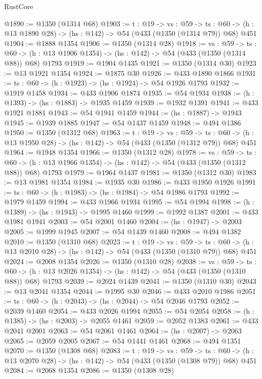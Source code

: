 \begin{lexlean}{RustCore}
\begin{coremodule}
@1890 := @1350 (@1314 @68)
@1903 := {t : @19} ->
  {vs : @59} ->
  {ts : @60} -> (h : @13 @1890 @28) -> (hs : @142) -> @54 (@433 (@1350 (@1314 @79)) @68) @451
@1904 := @1888 @1354
@1906 := @1350 (@1314 @28)
@1918 := {vs : @59} ->
  {ts : @60} -> (h : @13 @1906 @1354) -> (hs : @142) -> @54 (@433 (@1350 (@1314 @88)) @68) @1793
@1919 := @1904 @1435
@1921 := @1350 (@1314 @30)
@1923 := @13 @1921 @1354
@1924 := @1875 @30
@1926 := @433 @1890 @1866
@1931 := {ts : @60} -> (h : @1923) -> (hs : @1924) -> @54 @1926 @1793
@1932 := @1919 @1458
@1934 := @433 @1906 @1874
@1935 := @54 @1934
@1938 := (h : @1393) -> (hs : @1883) -> @1935 @1459
@1939 := @1932 @1391
@1941 := @433 @1921 @1881
@1943 := @54 @1941 @1459
@1944 := (hs : @1887) -> @1943
@1945 := @1939 @1885
@1947 := @54 @1437 @1459
@1948 := @494 @1386
@1950 := @1350 (@1312 @68)
@1963 := {t : @19} ->
  {vs : @59} ->
  {ts : @60} -> (h : @13 @1950 @28) -> (hs : @142) -> @54 (@433 (@1350 (@1312 @79)) @68) @451
@1964 := @1948 @1354
@1966 := @1350 (@1312 @28)
@1978 := {vs : @59} ->
  {ts : @60} -> (h : @13 @1966 @1354) -> (hs : @142) -> @54 (@433 (@1350 (@1312 @88)) @68) @1793
@1979 := @1964 @1437
@1981 := @1350 (@1312 @30)
@1983 := @13 @1981 @1354
@1984 := @1935 @30
@1986 := @433 @1950 @1926
@1991 := {ts : @60} -> (h : @1983) -> (hs : @1984) -> @54 @1986 @1793
@1992 := @1979 @1459
@1994 := @433 @1966 @1934
@1995 := @54 @1994
@1998 := (h : @1389) -> (hs : @1943) -> @1995 @1460
@1999 := @1992 @1387
@2001 := @433 @1981 @1941
@2003 := @54 @2001 @1460
@2004 := (hs : @1947) -> @2003
@2005 := @1999 @1945
@2007 := @54 @1439 @1460
@2008 := @494 @1382
@2010 := @1350 (@1310 @68)
@2023 := {t : @19} ->
  {vs : @59} ->
  {ts : @60} -> (h : @13 @2010 @28) -> (hs : @142) -> @54 (@433 (@1350 (@1310 @79)) @68) @451
@2024 := @2008 @1354
@2026 := @1350 (@1310 @28)
@2038 := {vs : @59} ->
  {ts : @60} -> (h : @13 @2026 @1354) -> (hs : @142) -> @54 (@433 (@1350 (@1310 @88)) @68) @1793
@2039 := @2024 @1439
@2041 := @1350 (@1310 @30)
@2043 := @13 @2041 @1354
@2044 := @1995 @30
@2046 := @433 @2010 @1986
@2051 := {ts : @60} -> (h : @2043) -> (hs : @2044) -> @54 @2046 @1793
@2052 := @2039 @1460
@2054 := @433 @2026 @1994
@2055 := @54 @2054
@2058 := (h : @1385) -> (hs : @2003) -> @2055 @1461
@2059 := @2052 @1383
@2061 := @433 @2041 @2001
@2063 := @54 @2061 @1461
@2064 := (hs : @2007) -> @2063
@2065 := @2059 @2005
@2067 := @54 @1441 @1461
@2068 := @494 @1351
@2070 := @1350 (@1308 @68)
@2083 := {t : @19} ->
  {vs : @59} ->
  {ts : @60} -> (h : @13 @2070 @28) -> (hs : @142) -> @54 (@433 (@1350 (@1308 @79)) @68) @451
@2084 := @2068 @1354
@2086 := @1350 (@1308 @28)

\end{coremodule}
\end{lexlean}
